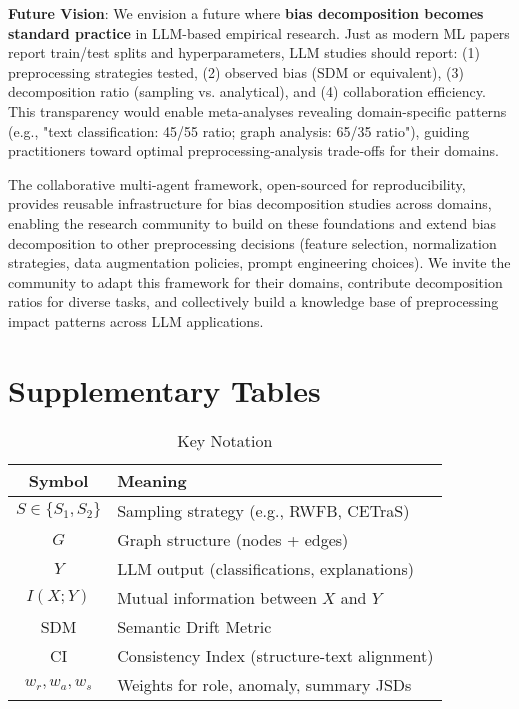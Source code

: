 \documentclass[conference]{IEEEtran}
\begin{document}
\textbf{Future Vision}: We envision a future where \textbf{bias decomposition becomes standard practice} in LLM-based empirical research. Just as modern ML papers report train/test splits and hyperparameters, LLM studies should report: (1) preprocessing strategies tested, (2) observed bias (SDM or equivalent), (3) decomposition ratio (sampling vs. analytical), and (4) collaboration efficiency. This transparency would enable meta-analyses revealing domain-specific patterns (e.g., "text classification: 45/55 ratio; graph analysis: 65/35 ratio"), guiding practitioners toward optimal preprocessing-analysis trade-offs for their domains.

The collaborative multi-agent framework, open-sourced for reproducibility, provides reusable infrastructure for bias decomposition studies across domains, enabling the research community to build on these foundations and extend bias decomposition to other preprocessing decisions (feature selection, normalization strategies, data augmentation policies, prompt engineering choices). We invite the community to adapt this framework for their domains, contribute decomposition ratios for diverse tasks, and collectively build a knowledge base of preprocessing impact patterns across LLM applications.

\appendix

\section{Supplementary Tables}
\label{sec:appendix}

\begin{table}[h]
\centering
\caption{Key Notation}
\label{tab:notation}
\small
\begin{tabular}{cl}
\toprule
\textbf{Symbol} & \textbf{Meaning} \\
\midrule
$S \in \{S_1, S_2\}$ & Sampling strategy (e.g., RWFB, CETraS) \\
$G$ & Graph structure (nodes + edges) \\
$Y$ & LLM output (classifications, explanations) \\
$I(X; Y)$ & Mutual information between $X$ and $Y$ \\
SDM & Semantic Drift Metric \\
CI & Consistency Index (structure-text alignment) \\
$w_r, w_a, w_s$ & Weights for role, anomaly, summary JSDs \\
\bottomrule
\end{tabular}
\end{table}



 
      


\end{document}
